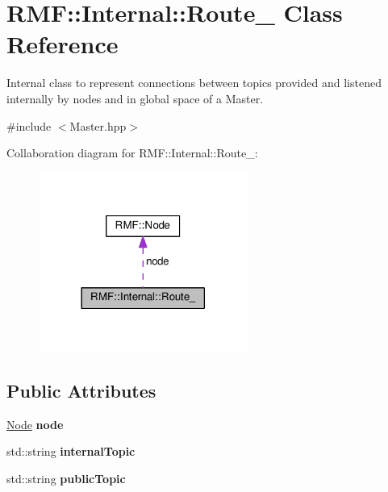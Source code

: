 \hypertarget{classRMF_1_1Internal_1_1Route__}{}\section{R\+MF\+:\+:Internal\+:\+:Route\+\_\+ Class Reference}
\label{classRMF_1_1Internal_1_1Route__}


Internal class to represent connections between topics provided and listened internally by nodes and in global space of a Master.  




{\ttfamily \#include $<$Master.\+hpp$>$}



Collaboration diagram for R\+MF\+:\+:Internal\+:\+:Route\+\_\+\+:\nopagebreak
\begin{figure}[H]
\begin{center}
\leavevmode
\includegraphics[width=194pt]{classRMF_1_1Internal_1_1Route____coll__graph}
\end{center}
\end{figure}
\subsection*{Public Attributes}
\begin{DoxyCompactItemize}
\item 
\hyperlink{classRMF_1_1Node}{Node} {\bfseries node}\hypertarget{classRMF_1_1Internal_1_1Route___a42ac220416ed21a3a72aea631439b644}{}\label{classRMF_1_1Internal_1_1Route___a42ac220416ed21a3a72aea631439b644}

\item 
std\+::string {\bfseries internal\+Topic}\hypertarget{classRMF_1_1Internal_1_1Route___a6e8e519abbfbd0e267945ec2e691fef9}{}\label{classRMF_1_1Internal_1_1Route___a6e8e519abbfbd0e267945ec2e691fef9}

\item 
std\+::string {\bfseries public\+Topic}\hypertarget{classRMF_1_1Internal_1_1Route___ac7ac0545070d02e23e32fc4ef3e85992}{}\label{classRMF_1_1Internal_1_1Route___ac7ac0545070d02e23e32fc4ef3e85992}

\end{DoxyCompactItemize}


